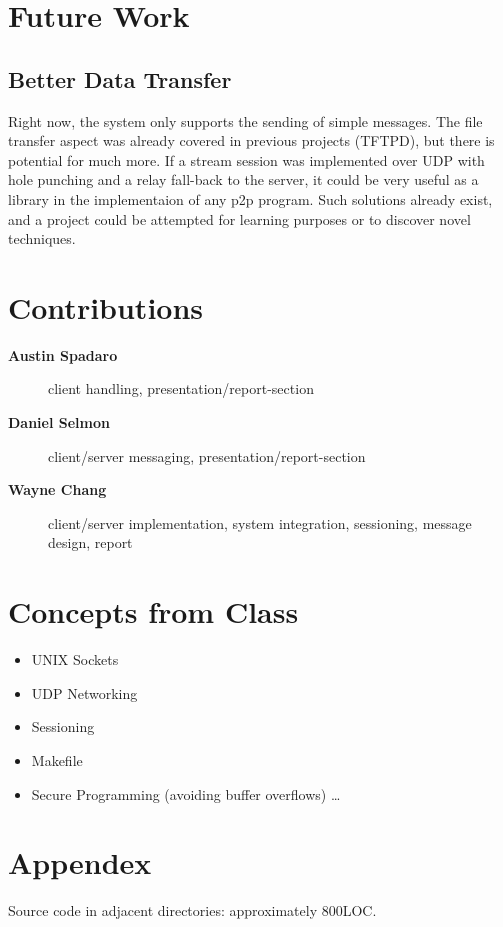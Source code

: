 \documentclass{article}
\begin{document}
\section{Future Work}
\subsection{Better Data Transfer}
Right now, the system only supports the sending of simple messages. The file transfer aspect was already covered in previous projects (TFTPD), but there is potential for much more. If a stream session was implemented over UDP with hole punching and a relay fall-back to the server, it could be very useful as a library in the implementaion of any p2p program. Such solutions already exist, and a project could be attempted for learning purposes or to discover novel techniques.

\section{Contributions}
\begin{description}
	\item[\textbf{Austin Spadaro}] client handling, presentation/report-section
	\item[\textbf{Daniel Selmon}] client/server messaging, presentation/report-section
	\item[\textbf{Wayne Chang}] client/server implementation, system integration, sessioning, message design, report
\end{description}

\section{Concepts from Class}
\begin{itemize}
\item UNIX Sockets
\item UDP Networking
\item Sessioning
\item Makefile
\item Secure Programming (avoiding buffer overflows)
\ldots
\end{itemize}

\section{Appendex}
Source code in adjacent directories: approximately 800LOC.



\end{document}
